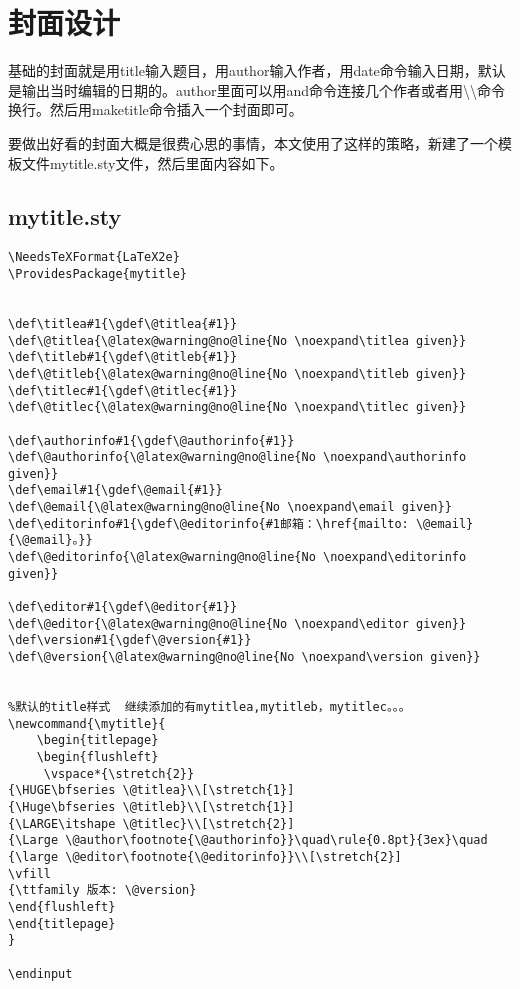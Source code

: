 \section{封面设计}
基础的封面就是用title输入题目，用author输入作者，用date命令输入日期，默认是输出当时编辑的日期的。author里面可以用and命令连接几个作者或者用\textbackslash \textbackslash 命令换行。然后用maketitle命令插入一个封面即可。

要做出好看的封面大概是很费心思的事情，本文使用了这样的策略，新建了一个模板文件mytitle.sty文件，然后里面内容如下。
\subsection{mytitle.sty}
\begin{verbatim}
\NeedsTeXFormat{LaTeX2e}
\ProvidesPackage{mytitle}


\def\titlea#1{\gdef\@titlea{#1}}
\def\@titlea{\@latex@warning@no@line{No \noexpand\titlea given}}
\def\titleb#1{\gdef\@titleb{#1}}
\def\@titleb{\@latex@warning@no@line{No \noexpand\titleb given}}
\def\titlec#1{\gdef\@titlec{#1}}
\def\@titlec{\@latex@warning@no@line{No \noexpand\titlec given}}

\def\authorinfo#1{\gdef\@authorinfo{#1}}
\def\@authorinfo{\@latex@warning@no@line{No \noexpand\authorinfo given}}
\def\email#1{\gdef\@email{#1}}
\def\@email{\@latex@warning@no@line{No \noexpand\email given}}
\def\editorinfo#1{\gdef\@editorinfo{#1邮箱：\href{mailto: \@email}{\@email}。}}
\def\@editorinfo{\@latex@warning@no@line{No \noexpand\editorinfo given}}

\def\editor#1{\gdef\@editor{#1}}
\def\@editor{\@latex@warning@no@line{No \noexpand\editor given}}
\def\version#1{\gdef\@version{#1}}
\def\@version{\@latex@warning@no@line{No \noexpand\version given}}


%默认的title样式  继续添加的有mytitlea,mytitleb，mytitlec。。。
\newcommand{\mytitle}{
	\begin{titlepage}
	\begin{flushleft}	
	 \vspace*{\stretch{2}}
{\HUGE\bfseries \@titlea}\\[\stretch{1}]
{\Huge\bfseries \@titleb}\\[\stretch{1}]
{\LARGE\itshape \@titlec}\\[\stretch{2}]
{\Large \@author\footnote{\@authorinfo}}\quad\rule{0.8pt}{3ex}\quad
{\large \@editor\footnote{\@editorinfo}}\\[\stretch{2}]
\vfill
{\ttfamily 版本: \@version}
\end{flushleft}
\end{titlepage}
}

\endinput
\end{verbatim}

